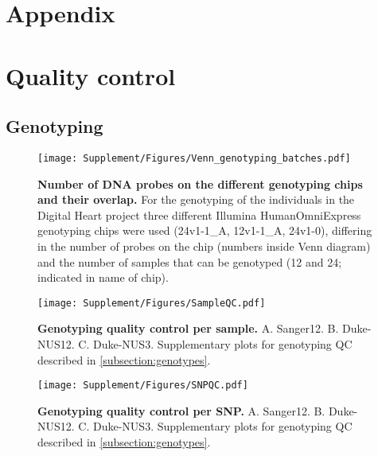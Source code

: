 \chapter*{Appendix}
\label{sec:appendix}

\chapter{Quality control}
\section{Genotyping}

\begin{figure}[hbtp]
	\centering
	\texttt{[image: Supplement/Figures/Venn\_genotyping\_batches.pdf]}
	\caption[\textbf{Number of DNA probes on the different genotyping chips and their overlap.}]{\textbf{Number of DNA probes on the different genotyping chips and their overlap.} For the genotyping of the individuals in the Digital Heart project three different Illumina HumanOmniExpress genotyping chips were used (24v1-1\_A, 12v1-1\_A, 24v1-0), differing in the number of probes on the chip (numbers inside Venn diagram) and the number of samples that can be genotyped (12 and 24; indicated in name of chip).}
 	\label{fig:probeoverlap}
\end{figure}

\begin{figure}[hbtp]
	\centering
	\texttt{[image: Supplement/Figures/SampleQC.pdf]}
	\caption[\textbf{Genotyping quality control per sample.}]{\textbf{Genotyping quality control per sample.} A. Sanger12. B. Duke-NUS12. C. Duke-NUS3. Supplementary plots for genotyping QC described in \cref{subsection:genotypes}.}
 	\label{fig:sampleQC}
\end{figure}

\begin{figure}[hbtp]
	\centering
	\texttt{[image: Supplement/Figures/SNPQC.pdf]}
	\caption[\textbf{Genotyping quality control per SNP.}]{\textbf{Genotyping quality control per SNP.} A. Sanger12. B. Duke-NUS12. C. Duke-NUS3. Supplementary plots for genotyping QC described in \cref{subsection:genotypes}.}
 	\label{fig:SNPQC}
 	\end{figure}

